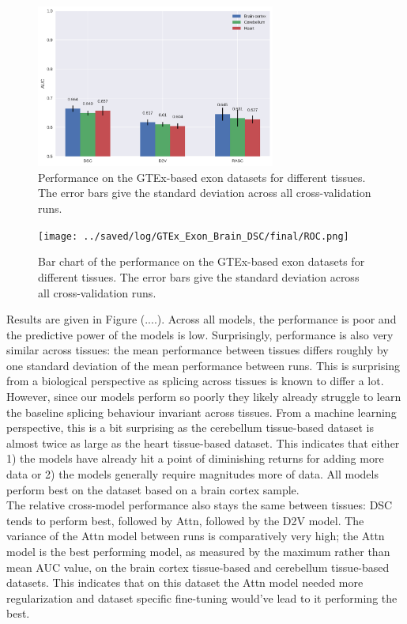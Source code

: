 \begin{figure}
	\centering\includegraphics[width=0.7\textwidth]{../visualizations/ch5-results/gtex_exon_barcharts.png} 
	\caption{Performance on the GTEx-based exon datasets for different tissues. The error bars give the standard deviation across all cross-validation runs. }
	\label{fig:gtex_exon_barcharts}
\end{figure}

\begin{figure}
	\centering\texttt{[image: ../saved/log/GTEx\_Exon\_Brain\_DSC/final/ROC.png]} 
	\caption{Bar chart of the performance on the GTEx-based exon datasets for different tissues. The error bars give the standard deviation across all cross-validation runs.  }
	\label{fig:gtex_exon_roc}
\end{figure}

Results are given in Figure (....). Across all models, the performance is poor and the predictive power of the models is low. Surprisingly, performance is also very similar across tissues: the mean performance between tissues differs roughly by one standard deviation of the mean performance between runs. This is surprising from a biological perspective as splicing across tissues is known to differ a lot. However, since our models perform so poorly they likely already struggle to learn the baseline splicing behaviour invariant across tissues. From a machine learning perspective, this is a bit surprising as the cerebellum tissue-based dataset is almost twice as large as the heart tissue-based dataset. This indicates that either 1) the models have already hit a point of diminishing returns for adding more data or 2) the models generally require magnitudes more of data. All models perform best on the dataset based on a brain cortex sample. \\
The relative cross-model performance also stays the same between tissues: DSC tends to perform best, followed by Attn, followed by the D2V model. The variance of the Attn model between runs is comparatively very high; the Attn model is the best performing model, as measured by the maximum rather than mean AUC value, on the brain cortex tissue-based and cerebellum tissue-based datasets. This indicates that on this dataset the Attn model needed more regularization and dataset specific fine-tuning would've lead to it performing the best. 


